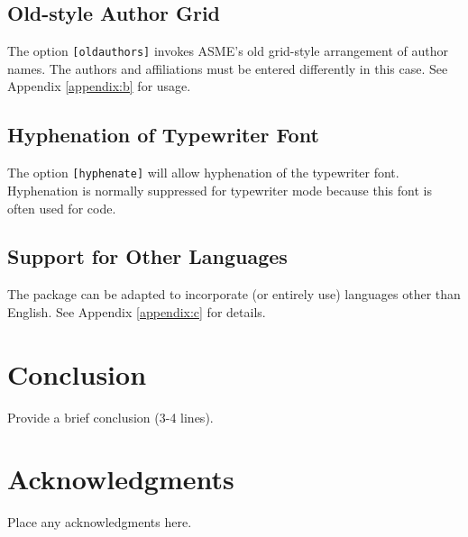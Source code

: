 \documentclass[varvw,largesc,upint,mathalfa=cal=euler,hyphenate,balance,lang-second=french,lang=english,colorlinks]{asmeconf} %
\begin{document}
\subsection{Old-style Author Grid} The option \texttt{[oldauthors]} invokes ASME's old grid-style arrangement of author names.  The authors and affiliations must be entered differently in this case. See Appendix \ref{appendix:b} for usage.

\subsection{Hyphenation of Typewriter Font} The option \texttt{[hyphenate]} will allow hyphenation of the typewriter font.
Hyphenation is normally suppressed for typewriter mode because this font is often used for code.

\subsection{Support for Other Languages}  The package can be adapted to incorporate (or entirely use) languages other than English. See Appendix \ref{appendix:c} for details.


\section{Conclusion}
Provide a brief conclusion (3-4 lines).



\section*{Acknowledgments}
Place any acknowledgments here.




\nocite{*} %

\end{document}
